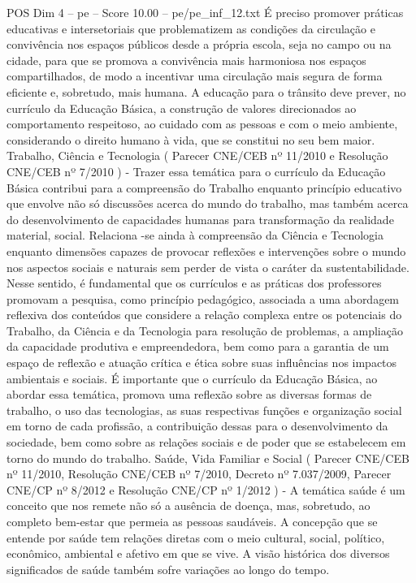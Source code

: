 \begin{textsample}{POS Dim 4 – pe – Score 10.00 – pe/pe\_inf\_12.txt}
É preciso promover práticas educativas e intersetoriais que problematizem as condições da circulação e convivência nos espaços públicos desde a própria escola, seja no campo ou na cidade, para que se promova a convivência mais harmoniosa nos espaços compartilhados, de modo a incentivar uma circulação mais segura de forma eficiente e, sobretudo, mais humana.
A educação para o trânsito deve prever, no currículo da Educação Básica, a construção de valores direcionados ao comportamento respeitoso, ao cuidado com as pessoas e com o meio ambiente, considerando o direito humano à vida, que se constitui no seu bem maior.
Trabalho, Ciência e Tecnologia ( Parecer CNE/CEB nº 11/2010 e Resolução CNE/CEB nº 7/2010 ) - Trazer essa temática para o currículo da Educação Básica contribui para a compreensão do Trabalho enquanto princípio educativo que envolve não só discussões acerca do mundo do trabalho, mas também acerca do desenvolvimento de capacidades humanas para transformação da realidade material, social.
Relaciona -se ainda à compreensão da Ciência e Tecnologia enquanto dimensões capazes de provocar reflexões e intervenções sobre o mundo nos aspectos sociais e naturais sem perder de vista o caráter da sustentabilidade.
Nesse sentido, é fundamental que os currículos e as práticas dos professores promovam a pesquisa, como princípio pedagógico, associada a uma abordagem reflexiva dos conteúdos que considere a relação complexa entre os potenciais do Trabalho, da Ciência e da Tecnologia para resolução de problemas, a ampliação da capacidade produtiva e empreendedora, bem como para a garantia de um espaço de reflexão e atuação crítica e ética sobre suas influências nos impactos ambientais e sociais.
É importante que o currículo da Educação Básica, ao abordar essa temática, promova uma reflexão sobre as diversas formas de trabalho, o uso das tecnologias, as suas respectivas funções e organização social em torno de cada profissão, a contribuição dessas para o desenvolvimento da sociedade, bem como sobre as relações sociais e de poder que se estabelecem em torno do mundo do trabalho.
Saúde, Vida Familiar e Social ( Parecer CNE/CEB nº 11/2010, Resolução CNE/CEB nº 7/2010, Decreto nº 7.037/2009, Parecer CNE/CP nº 8/2012 e Resolução CNE/CP nº 1/2012 ) - A temática saúde é um conceito que nos remete não só a ausência de doença, mas, sobretudo, ao completo bem-estar que permeia as pessoas saudáveis.
A concepção que se entende por saúde tem relações diretas com o meio cultural, social, político, econômico, ambiental e afetivo em que se vive.
A visão histórica dos diversos significados de saúde também sofre variações ao longo do tempo.

\end{textsample}
